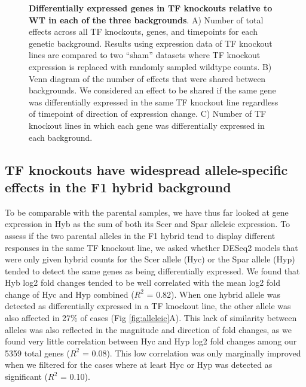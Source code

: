 \begin{figure}
     \caption{\textbf{Differentially expressed genes in TF knockouts relative to WT in each of the three backgrounds}. A) Number of total effects across all TF knockouts, genes, and timepoints for each genetic background. Results using expression data of TF knockout lines are compared to two ``sham'' datasets where TF knockout expression is replaced with randomly sampled wildtype counts. B) Venn diagram of the number of effects that were shared between backgrounds. We considered an effect to be shared if the same gene was differentially expressed in the same TF knockout line regardless of timepoint of direction of expression change. C) Number of TF knockout lines in which each gene was differentially expressed in each background.}
    \label{fig:tfdel}
\end{figure}

\subsection{TF knockouts have widespread allele-specific effects in the F1 hybrid background}

To be comparable with the parental samples, we have thus far looked at gene expression in Hyb as the sum of both its Scer and Spar alleleic expression. To assess if the two parental alleles in the F1 hybrid tend to display different responses in the same TF knockout line, we asked whether DESeq2 models that were only given hybrid counts for the Scer allele (Hyc) or the Spar allele (Hyp) tended to detect the same genes as being differentially expressed. We found that Hyb log2 fold changes tended to be well correlated with the mean log2 fold change of Hyc and Hyp combined ($R^2$ = 0.82). When one hybrid allele was detected as differentially expressed in a TF knockout line, the other allele was also affected in 27\% of cases (Fig \ref{fig:alleleic}A). This lack of similarity between alleles was also reflected in the magnitude and direction of fold changes, as we found very little correlation between Hyc and Hyp log2 fold changes among our 5359 total genes ($R^2$ = 0.08). This low correlation was only marginally improved when we filtered for the cases where at least Hyc or Hyp was detected as significant ($R^2$ = 0.10).


